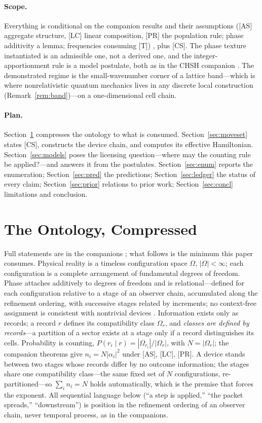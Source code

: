 \documentclass[11pt]{article}
\theoremstyle{definition}
\theoremstyle{remark}
\begin{document}
\paragraph{Scope.} Everything is conditional on the companion results and their assumptions ([AS] aggregate structure, [LC] linear composition, [PR] the population rule; phase additivity a lemma; frequencies consuming [T]) \cite{TillittBorn}, plus [CS]. The phase texture instantiated is an admissible one, not a derived one, and the integer-apportionment rule is a model postulate, both as in the CHSH companion \cite{TillittCHSH}. The demonstrated regime is the small-wavenumber corner of a lattice band---which is where nonrelativistic quantum mechanics lives in any discrete local construction (Remark~\ref{rem:band})---on a one-dimensional cell chain.

\paragraph{Plan.} Section~\ref{sec:ontology} compresses the ontology to what is consumed. Section~\ref{sec:moveset} states [CS], constructs the device chain, and computes its effective Hamiltonian. Section~\ref{sec:models} poses the licensing question---where may the counting rule be applied?---and answers it from the postulates. Section~\ref{sec:enum} reports the enumeration; Section~\ref{sec:pred} the predictions; Section~\ref{sec:ledger} the status of every claim; Section~\ref{sec:prior} relations to prior work; Section~\ref{sec:concl} limitations and conclusion.

\section{The Ontology, Compressed}\label{sec:ontology}
Full statements are in the companions \cite{TillittBorn,TillittCR}; what follows is the minimum this paper consumes. Physical reality is a timeless configuration space $\Omega$, $|\Omega| < \infty$; each configuration is a complete arrangement of fundamental degrees of freedom. Phase attaches additively to degrees of freedom and is relational---defined for each configuration relative to a stage of an observer chain, accumulated along the refinement ordering, with successive stages related by increments; no context-free assignment is consistent with nontrivial devices \cite{TillittBorn}. Information exists only as records; a record $r$ defines its compatibility class $\Omega_r$, and \emph{classes are defined by records}---a partition of a sector exists at a stage only if a record distinguishes its cells. Probability is counting, $P(r_i \mid r) = |\Omega_{r_i}|/|\Omega_r|$, with $N = |\Omega_r|$; the companion theorems give $n_i = N|\alpha_i|^2$ under [AS], [LC], [PR]. A device stands between two stages whose records differ by no outcome information; the stages share one compatibility class---the same fixed set of $N$ configurations, re-partitioned---so $\sum_i n_i = N$ holds automatically, which is the premise that forces the exponent. All sequential language below (``a step is applied,'' ``the packet spreads,'' ``downstream'') is position in the refinement ordering of an observer chain, never temporal process, as in the companions.
\end{document}
